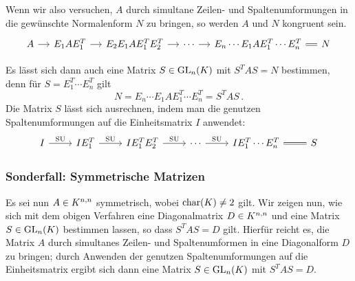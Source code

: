 Wenn wir also versuchen, $A$ durch simultane Zeilen- und Spaltenumformungen in die gewünschte Normalenform $N$ zu bringen, so werden $A$ und $N$ kongruent sein.
\[
  \begin{tikzcd}[column sep = small]
      A
      \arrow{r}
    & E_1 A E_1^T
      \arrow{r}
    & E_2 E_1 A E_1^T E_2^T
      \arrow{r}
    & \cdots
      \arrow{r}
    & E_n \dotsm E_1 A E_1^T \dotsm E_n^T
      \arrow[equal]{r}
    & N
  \end{tikzcd}
\]

Es lässt sich dann auch eine Matrix $S \in \GL{n}{K}$ mit $S^T A S = N$ bestimmen, denn für $S = E_1^T \dotsm E_n^T$ gilt
\[
    N
  = E_n \dotsm E_1 A E_1^T \dotsm E_n^T
  = S^T A S \,. 
\]
Die Matrix $S$ lässt sich ausrechnen, indem man die genutzen Spaltenumformungen auf die Einheitsmatrix $I$ anwendet:
\[
  \begin{tikzcd}
      I
      \arrow{r}[above]{\text{SU}}
    & I E_1^T
      \arrow{r}[above]{\text{SU}}
    & I E_1^T E_2^T
      \arrow{r}[above]{\text{SU}}
    & \cdots
      \arrow{r}[above]{\text{SU}}
    & I E_1^T \dotsm E_n^T
      \arrow[equal]{r}
    & S
  \end{tikzcd}
\]



\subsubsection*{Sonderfall: Symmetrische Matrizen}

Es sei nun $A \in \matrices{n}{K}$ symmetrisch, wobei $\ringchar(K) \neq 2$ gilt.
Wir zeigen nun, wie sich mit dem obigen Verfahren eine Diagonalmatrix $D \in \matrices{n}{K}$ und eine Matrix $S \in \GL{n}{K}$ bestimmen lassen, so dass $S^T A S = D$ gilt.
Hierfür reicht es, die Matrix $A$ durch simultanes Zeilen- und Spaltenumformen in eine Diagonalform $D$ zu bringen;
durch Anwenden der genutzen Spaltenumformungen auf die Einheitsmatrix ergibt sich dann eine Matrix $S \in \GL{n}{K}$ mit $S^T A S = D$.


